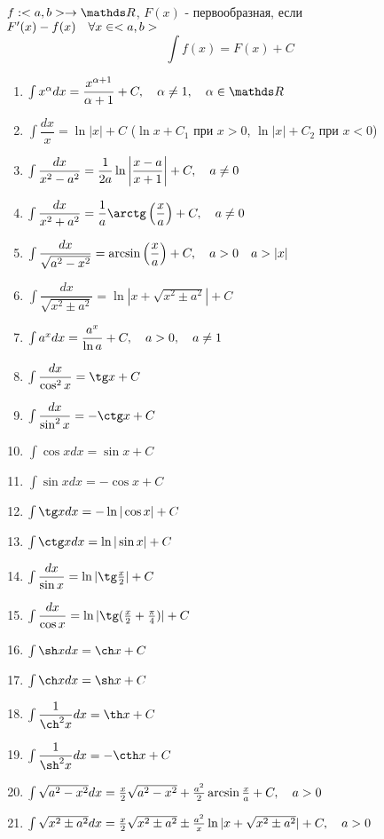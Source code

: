 \documentclass[main]{subfiles}
\begin{document}
    \begin{definition}
        $f: <a,b> \ra \R$, $F(x)$ - первообразная, если $F'(x) - f(x)\quad \forall x \in <a,b>$
        \[\int f(x) = F(x) + C\]
    \end{definition}

    \begin{utv}
        \begin{enumerate}
          \item $\int x^{\alpha} dx = \dfrac{x^{\alpha + 1}}{\alpha + 1} + C,\q \alpha \neq 1,\q \alpha \in \R$
          \item $\int \dfrac{dx}{x} = \ln|x| + C$ ($\ln x + C_1$ при $x>0$, $\ln|x| + C_2$ при $x<0$)
          \item $\int \dfrac{dx}{x^2 - a^2} = \dfrac{1}{2a} \ln \left|\dfrac{x-a}{x+1}\right| + C,\quad a \neq 0$
          \item $\int \dfrac{dx}{x^2 + a^2} = \dfrac{1}{a} \arctg \Br{\dfrac{x}{a}} + C,\q a \neq 0$
          \item $\int \dfrac{dx}{\sqrt{a^2 - x^2}} = \arcsin \left(\dfrac{x}{a}\right) + C,\quad a > 0 \quad a > |x|$
          \item $\int \dfrac{dx}{\sqrt{x^2 \pm a^2}} = \ln|x + \sqrt{x^2 \pm a^2}| + C$
          \item $\int a^x dx = \dfrac{a^x}{\ln a} + C,\quad a>0,\quad a \neq 1$
          \item $\int \dfrac{dx}{\cos^2 x} = \tg x + C$
          \item $\int \dfrac{dx}{\sin^2 x} = -\ctg x + C$
          \item $\int \cos x dx = \sin x + C$
          \item $\int \sin x dx = -\cos x + C$
          \item $\int \tg x dx = -\ln|\cos x| + C$
          \item $\int \ctg x dx = \ln|\sin x| + C$
          \item $\int \dfrac{dx}{\sin x} = \ln|\tg \frac{x}{2}| + C$
          \item $\int \dfrac{dx}{\cos x} = \ln|\tg(\frac{x}{2} + \frac{\pi}{4})| + C$
          \item $\int \sh x dx  = \ch x + C$
          \item $\int \ch x dx = \sh x + C$
          \item $\int \dfrac{1}{\ch^2 x} dx = \th x + C$
          \item $\int \dfrac{1}{\sh^2 x} dx = -\cth x + C$
          \item $\int \sqrt{a^2 - x^2} dx = \frac{x}{2} \sqrt{a^2 - x^2} + \frac{a^2}{2} \arcsin \frac{x}{a} + C, \quad a>0$
          \item $\int \sqrt{x^2 \pm a^2} dx = \frac{x}{2} \sqrt{x^2 \pm a^2} \pm \frac{a^2}{x} \ln|x + \sqrt{x^2 \pm a^2}| + C,\quad a>0$
        \end{enumerate}
    \end{utv}
\end{document}
